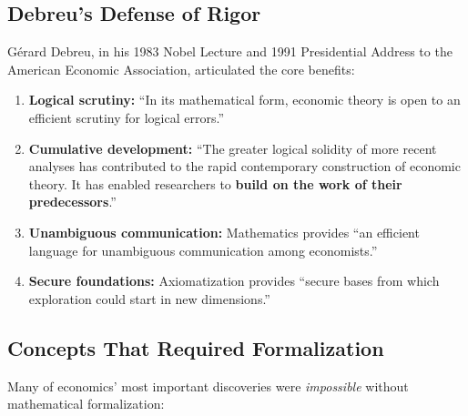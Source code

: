 \documentclass[12pt,a4paper]{article}
\begin{document}
\subsection{Debreu's Defense of Rigor}

G\'{e}rard Debreu, in his 1983 Nobel Lecture and 1991 Presidential Address to the American Economic Association, articulated the core benefits:

\begin{enumerate}[nosep]
\item \textbf{Logical scrutiny:} ``In its mathematical form, economic theory is open to an efficient scrutiny for logical errors.''
\item \textbf{Cumulative development:} ``The greater logical solidity of more recent analyses has contributed to the rapid contemporary construction of economic theory. It has enabled researchers to \textbf{build on the work of their predecessors}.''
\item \textbf{Unambiguous communication:} Mathematics provides ``an efficient language for unambiguous communication among economists.''
\item \textbf{Secure foundations:} Axiomatization provides ``secure bases from which exploration could start in new dimensions.''
\end{enumerate}

\subsection{Concepts That Required Formalization}

Many of economics' most important discoveries were \textit{impossible} without mathematical formalization:
\end{document}
